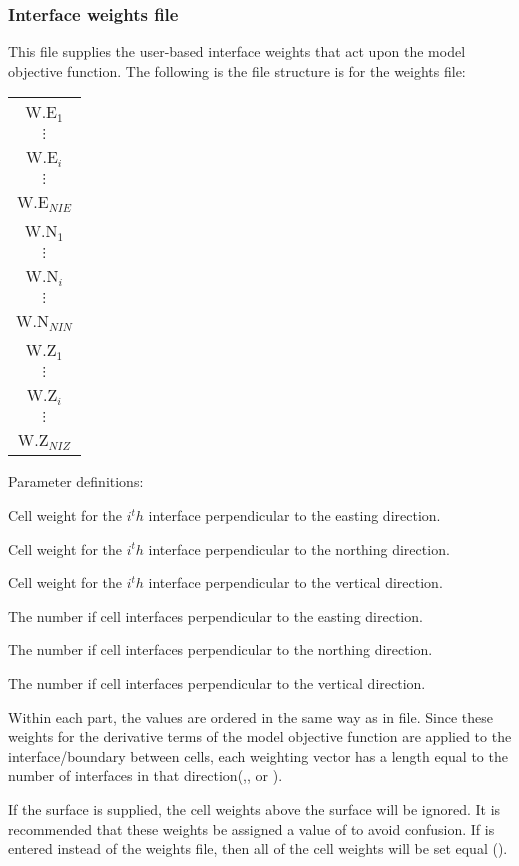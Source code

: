 \subsubsection{Interface weights file}
This file supplies the user-based interface weights that act upon the model objective function. The following is the file structure is for the weights file:

\begin{fileExample}
\begin{tabular}{|c|}
\hline
W.E$_{1}$ \\
$\vdots$ \\
W.E$_{i}$ \\
$\vdots$ \\
W.E$_{NIE}$ \\
W.N$_{1}$ \\
$\vdots$ \\
W.N$_{i}$ \\
$\vdots$ \\
W.N$_{NIN}$ \\
W.Z$_{1}$ \\
$\vdots$ \\
W.Z$_{i}$ \\
$\vdots$ \\
W.Z$_{NIZ}$ \\
\hline
\end{tabular}
\end{fileExample}

Parameter definitions:
\begin{description}[leftmargin=5cm, style=sameline, align=left]
\item[\codeName{W.E$_{i}$}] Cell weight for the $i^th$ interface perpendicular to the easting direction.
\item[\codeName{W.N$_{i}$}] Cell weight for the $i^th$ interface perpendicular to the northing direction.
\item[\codeName{W.Z$_{i}$}] Cell weight for the $i^th$ interface perpendicular to the vertical direction.
\item[\codeName{NIE}] The number if cell interfaces perpendicular to the easting direction.
\item[\codeName{NIN}] The number if cell interfaces perpendicular to the northing direction.
\item[\codeName{NIZ}] The number if cell interfaces perpendicular to the vertical direction.
\end{description}

Within each part, the values are ordered in the same way as in  file. Since these weights for the derivative terms of the model objective function are applied to the interface/boundary between cells, each weighting vector has a length equal to the number of interfaces in that direction(,, or ).

If the surface  is supplied, the cell weights above the surface will be ignored. It is recommended that these weights be assigned a value of  to avoid confusion. If  is entered instead of the weights file, then all of the cell weights will be set equal ().